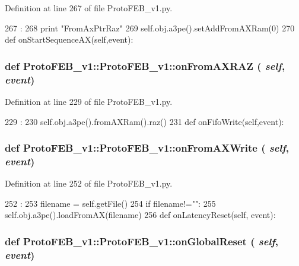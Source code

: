 Definition at line 267 of file ProtoFEB\_\-v1.py.


\begin{DoxyCode}
267                                    :
268         print "FromAxPtrRaz"
269         self.obj.a3pe().setAddFromAXRam(0)
270 
    def onStartSequenceAX(self,event):
\end{DoxyCode}
\hypertarget{classProtoFEB__v1_1_1ProtoFEB__v1_a376ce4530a692a13a20eafd3ebacd2ff}{
\subsubsection[{onFromAXRAZ}]{\setlength{\rightskip}{0pt plus 5cm}def ProtoFEB\_\-v1::ProtoFEB\_\-v1::onFromAXRAZ ( {\em self}, \/   {\em event})}}
\label{classProtoFEB__v1_1_1ProtoFEB__v1_a376ce4530a692a13a20eafd3ebacd2ff}


Definition at line 229 of file ProtoFEB\_\-v1.py.


\begin{DoxyCode}
229                                 :
230         self.obj.a3pe().fromAXRam().raz()
231 
    def onFifoWrite(self,event):
\end{DoxyCode}
\hypertarget{classProtoFEB__v1_1_1ProtoFEB__v1_a88cb2dd98480dc46cf29ddfefea35d1a}{
\subsubsection[{onFromAXWrite}]{\setlength{\rightskip}{0pt plus 5cm}def ProtoFEB\_\-v1::ProtoFEB\_\-v1::onFromAXWrite ( {\em self}, \/   {\em event})}}
\label{classProtoFEB__v1_1_1ProtoFEB__v1_a88cb2dd98480dc46cf29ddfefea35d1a}


Definition at line 252 of file ProtoFEB\_\-v1.py.


\begin{DoxyCode}
252                                  :
253         filename = self.getFile()
254         if filename!="":
255             self.obj.a3pe().loadFromAX(filename)
256 
    def onLatencyReset(self, event):
\end{DoxyCode}
\hypertarget{classProtoFEB__v1_1_1ProtoFEB__v1_aa47e9d0b2e8282ee4ae9e8c5c99e11d9}{
\subsubsection[{onGlobalReset}]{\setlength{\rightskip}{0pt plus 5cm}def ProtoFEB\_\-v1::ProtoFEB\_\-v1::onGlobalReset ( {\em self}, \/   {\em event})}}
\label{classProtoFEB__v1_1_1ProtoFEB__v1_aa47e9d0b2e8282ee4ae9e8c5c99e11d9}


